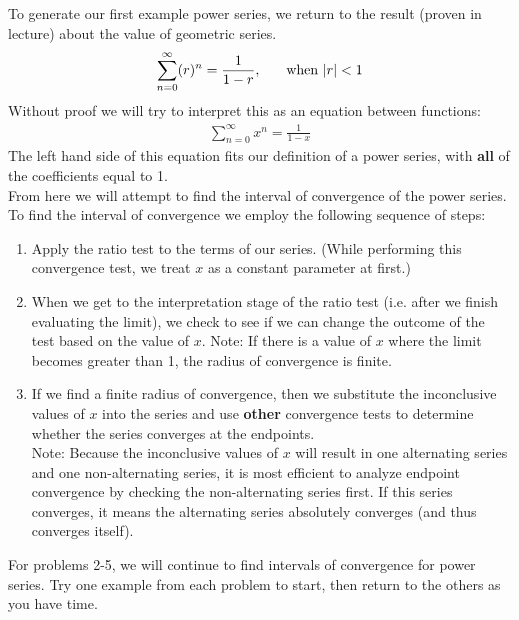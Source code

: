 \documentclass{ximera}
\begin{document}
\begin{exercise}
To generate our first example power series, we return to the result (proven in lecture) about the value of geometric series.
    \begin{align}
	    \sum_{n=0}^\infty (r)^n = \frac{1}{1-r}, \hspace{.2in} \text{ when }|r|<1\nonumber\end{align}
Without proof we will try to interpret this as an equation between functions:
    \begin{align}
	    \sum_{n=0}^\infty x^n = \frac{1}{1-x} \nonumber
    \end{align}
The left hand side of this equation fits our definition of a power series, with \textbf{all} of the coefficients equal to 1.\\  

From here we will attempt to find the interval of convergence of the power series.\\

To find the interval of convergence we employ the following sequence of steps:
\begin{enumerate}
    \item Apply the ratio test to the terms of our series. (While performing this convergence test, we treat $x$ as a constant parameter at first.)

    \item When we get to the interpretation stage of the ratio test (i.e. after we finish evaluating the limit), we check to see if we can change the outcome of the test based on the value of $x$. Note: If there is a value of $x$ where the limit becomes greater than 1, the radius of convergence is finite.
    
    \item If we find a finite radius of convergence, then we substitute the inconclusive values of $x$ into the series and use {\bf{other}} convergence tests to determine whether the series converges at the endpoints. \\
    Note: Because the inconclusive values of $x$ will result in one alternating series and one non-alternating series, it is most efficient to analyze endpoint convergence by checking the non-alternating series first.  If this series converges, it means the alternating series absolutely converges (and thus converges itself).  
\end{enumerate}
\end{exercise}


For problems 2-5, we will continue to find intervals of convergence for power series.  Try one example from each problem to start, then return to the others as you have time.
\end{document}
